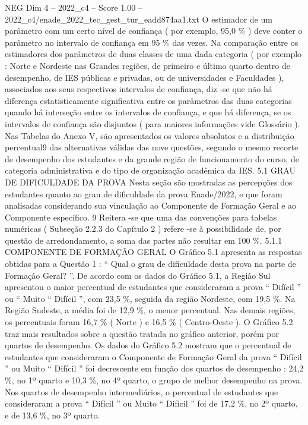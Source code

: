\begin{textsample}{NEG Dim 4 – 2022\_c4 – Score 1.00 – 2022\_c4/enade\_2022\_tec\_gest\_tur\_eadd874aa1.txt}
O estimador de um parâmetro com um certo nível de confiança ( por exemplo, 95,0 \% ) deve conter o parâmetro no intervalo de confiança em 95 \% das vezes.
Na comparação entre os estimadores dos parâmetros de duas classes de uma dada categoria ( por exemplo : Norte e Nordeste nas Grandes regiões, de primeiro e último quarto dentro de desempenho, de IES públicas e privadas, ou de universidades e Faculdades ), associados aos seus respectivos intervalos de confiança, diz -se que não há diferença estatisticamente significativa entre os parâmetros das duas categorias quando há interseção entre os intervalos de confiança, e que há diferença, se os intervalos de confiança são disjuntos ( para maiores informações vide Glossário ).
Nas Tabelas do Anexo V, são apresentados os valores absolutos e a distribuição percentual9 das alternativas válidas das nove questões, segundo o mesmo recorte de desempenho dos estudantes e da grande região de funcionamento do curso, de categoria administrativa e do tipo de organização acadêmica da IES. 5.1 GRAU DE DIFICULDADE DA PROVA Nesta seção são mostradas as percepções dos estudantes quanto ao grau de dificuldade da prova Enade/2022, e que foram analisadas considerando sua vinculação ao Componente de Formação Geral e ao Componente específico. 9 Reitera -se que uma das convenções para tabelas numéricas ( Subseção 2.2.3 do Capítulo 2 ) refere -se à possibilidade de, por questão de arredondamento, a soma das partes não resultar em 100 \%. 5.1.1 COMPONENTE DE FORMAÇÃO GERAL O Gráfico 5.1 apresenta as respostas obtidas para a Questão 1 : “ Qual o grau de dificuldade desta prova na parte de Formação Geral? ”.
De acordo com os dados do Gráfico 5.1, a Região Sul apresentou o maior percentual de estudantes que consideraram a prova “ Difícil ” ou “ Muito “ Difícil ”, com 23,5 \%, seguida da região Nordeste, com 19,5 \%.
Na Região Sudeste, a média foi de 12,9 \%, o menor percentual.
Nas demais regiões, os percentuais foram 16,7 \% ( Norte ) e 16,5 \% ( Centro-Oeste ).
O Gráfico 5.2 traz mais resultados sobre a questão tratada no gráfico anterior, porém por quartos de desempenho.
Os dados do Gráfico 5.2 mostram que o percentual de estudantes que consideraram o Componente de Formação Geral da prova “ Difícil ” ou Muito “ Difícil ” foi decrescente em função dos quartos de desempenho : 24,2 \%, no 1º quarto e 10,3 \%, no 4º quarto, o grupo de melhor desempenho na prova.
Nos quartos de desempenho intermediários, o percentual de estudantes que consideraram a prova “ Difícil ” ou Muito “ Difícil ” foi de 17,2 \%, no 2º quarto, e de 13,6 \%, no 3º quarto.

\end{textsample}

